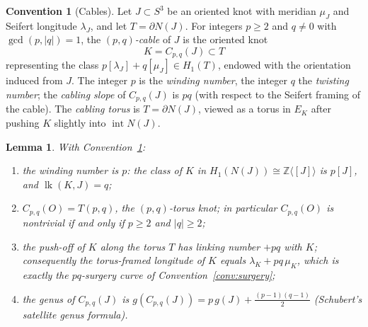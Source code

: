 \documentclass[11pt]{article}
\newtheorem{lemma}[theorem]{Lemma}
\theoremstyle{definition}
\newtheorem{convention}[theorem]{Convention}
\theoremstyle{remark}
\numberwithin{equation}{section}
\begin{document}
\begin{convention}[Cables]\label{conv:cable}
Let $J\subset S^{3}$ be an oriented knot with meridian $\mu_{J}$ and
Seifert longitude $\lambda_{J}$, and let $T=\partial N(J)$.  For
integers $p\ge 2$ and $q\neq 0$ with $\gcd(p,|q|)=1$, the
\emph{$(p,q)$-cable} of $J$ is the oriented knot
\[
K=C_{p,q}(J)\subset T
\]
representing the class
$p[\lambda_{J}]+q[\mu_{J}]\in H_{1}(T)$, endowed with the orientation
induced from $J$.  The integer $p$ is the \emph{winding number}, the
integer $q$ the \emph{twisting number}; the \emph{cabling slope} of
$C_{p,q}(J)$ is $pq$ (with respect to the Seifert framing of the cable).
The \emph{cabling torus} is $T=\partial N(J)$, viewed as a torus in
$E_{K}$ after pushing $K$ slightly into $\operatorname{int}N(J)$.
\end{convention}

\begin{lemma}\label{lem:cable-basics}
With Convention~\ref{conv:cable}:
\begin{enumerate}
\item[(i)] the winding number is $p$: the class of $K$ in
$H_{1}(N(J))\cong\mathbb{Z}\langle[J]\rangle$ is $p[J]$, and
$\operatorname{lk}(K,J)=q$;
\item[(ii) ] $C_{p,q}(O)=T(p,q)$, the $(p,q)$-torus knot; in particular
$C_{p,q}(O)$ is nontrivial if and only if $p\ge2$ and $|q|\ge 2$;
\item[(iii)] the push-off of $K$ along the torus $T$ has linking number
$+pq$ with $K$; consequently the torus-framed longitude of $K$ equals
$\lambda_{K}+pq\,\mu_{K}$, which is exactly the $pq$-surgery curve of
Convention~\ref{conv:surgery};
\item[(iv)] the genus of $C_{p,q}(J)$ is
$g(C_{p,q}(J))=p\,g(J)+\tfrac{(p-1)(q-1)}{2}$
(Schubert's satellite genus formula).
\end{enumerate}
\end{lemma}
\end{document}
